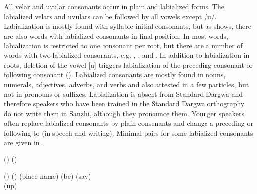 All velar and uvular consonants occur in plain and labialized forms. The labialized velars and uvulars can be followed by all vowels except /u/. Labialization is mostly found with syllable-initial consonants, but as  shows, there are also words with labialized consonants in final position. In most words, labialization is restricted to one consonant per root, but there are a number of words with two labialized consonants, e.g.  ,  , and  . In addition to labialization in roots, deletion of the vowel [u] triggers labialization of the preceding consonant or following consonant (). Labialized consonants are mostly found in nouns, numerals, adjectives, adverbs, and verbs and also attested in a few particles, but not in pronouns or suffixes. Labialization is absent from Standard Dargwa and therefore speakers who have been trained in the Standard Dargwa orthography do not write them in Sanzhi, although they pronounce them. Younger speakers often replace labialized consonants by plain consonants and change a preceding or following  to  (in speech and writing). Minimal pairs for some labialized consonants are given in .
%
\begin{exe}
	\ex	\label{ex:labialization phon@A}
	\begin{xlist}
		\TabPositions{14em}
		\ex	{} () 	\tab {} () \label{ex:delqij phon}
		
		\ex	{} () 	\tab {} () 	\label{ex:bixwij phon}
		\ex	{}  (place name)	\tab {}  (be) \label{ex:akri phon}
		\ex	{} 	\tab {} 	(say) \label{ex:ikwij phon}\\
		(up) 
	\end{xlist}
\end{exe}

